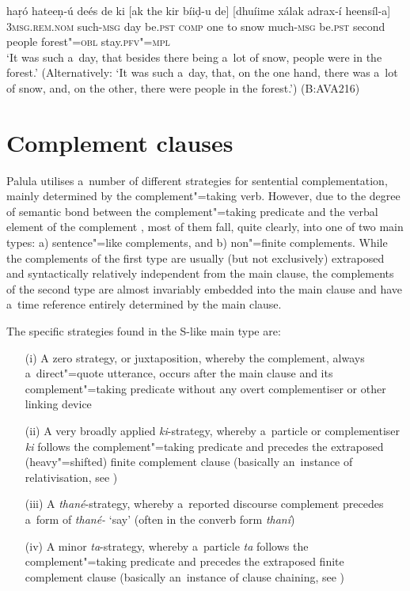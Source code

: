 \begin{exe}
\ex
\label{ex:13-126}
\gll haṛó hateeṇ-ú deés de ki [ak  the kir bíiḍ-u de] [dhuíime xálak  adrax-í heensíl-a] \\
\textsc{3msg.rem.nom} such-\textsc{msg}  day be.\textsc{pst} \textsc{comp} one  to snow much-\textsc{msg} be.\textsc{pst} second people  forest"=\textsc{obl} stay.\textsc{pfv"=mpl} \\
\glt `It was such a~day, that besides there being a~lot of snow, people were in the forest.' (Alternatively: `It was such a~day, that, on the one hand, there was a~lot of snow, and, on the other, there were people in the forest.') (B:AVA216)
\end{exe}

\section{Complement clauses}
\label{sec:13-5}

Palula utilises a~number of different strategies for sentential complementation, mainly determined by the complement"=taking verb. However, due to the degree of semantic bond between the complement"=taking predicate and the verbal element of the complement \citep[39-40]{givon2001b}, most of them fall, quite clearly, into one of two main types: a) sentence"=like complements, and b) non"=finite complements. While the complements of the first type are usually (but not exclusively) extraposed and syntactically relatively independent from the main clause, the complements of the second type are almost invariably embedded into the main clause and have a~time reference entirely determined by the main clause.

The specific strategies found in the S-like main type are:

\begin{enumerate}
\item[(i)] A zero strategy, or juxtaposition, whereby the complement, always a~direct"=quote utterance, occurs after the main clause and its complement"=taking predicate without any overt complementiser or other linking device
\item[(ii)] A very broadly applied \textit{ki}-strategy, whereby a~particle or complementiser \textit{ki} follows the complement"=taking predicate and precedes the extraposed (heavy"=shifted) finite complement clause (basically an~instance of relativisation, see )
\item[(iii)] A \textit{thané}-strategy, whereby a~reported discourse complement precedes a~form of \textit{thané-} `say' (often in the converb form \textit{thaní})
\item[(iv)] A minor \textit{ta}-strategy, whereby a~particle \textit{ta} follows the complement"=taking predicate and precedes the extraposed finite complement clause (basically an~instance of clause chaining, see )
\end{enumerate}

